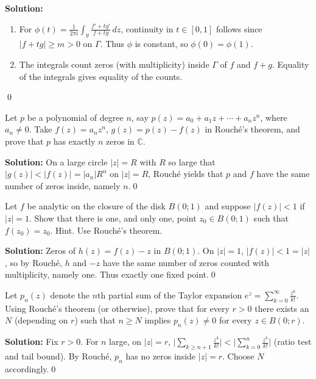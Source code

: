 \bigskip\noindent\textbf{Solution:}
\begin{enumerate}[label=(\alph*)]
\item For $\phi(t)=\frac{1}{2\pi i}\int_{y}\frac{f'+t g'}{f+tg}\,dz$, continuity in $t\in[0,1]$ follows since $|f+tg|\ge m>0$ on $\Gamma$. Thus $\phi$ is constant, so $\phi(0)=\phi(1)$.
\item The integrals count zeros (with multiplicity) inside $\Gamma$ of $f$ and $f+g$. Equality of the integrals gives equality of the counts.
\end{enumerate}\qed


\begin{problembox}
Let \( p \) be a polynomial of degree \( n \), say \( p(z) = a_0 + a_1 z + \cdots + a_n z^n \), where \( a_n \neq 0 \). Take \( f(z) = a_n z^n \), \( g(z) = p(z) - f(z) \) in Rouché's theorem, and prove that \( p \) has exactly \( n \) zeros in \( \mathbb{C} \).
\end{problembox}

\bigskip\noindent\textbf{Solution:}
On a large circle $|z|=R$ with $R$ so large that $|g(z)|<|f(z)|=|a_n|R^n$ on $|z|=R$, Rouché yields that $p$ and $f$ have the same number of zeros inside, namely $n$.\qed


\begin{problembox}
Let \( f \) be analytic on the closure of the disk \( B(0; 1) \) and suppose \( |f(z)| < 1 \) if \( |z| = 1 \). Show that there is one, and only one, point \( z_0 \in B(0; 1) \) such that \( f(z_0) = z_0 \). Hint. Use Rouché's theorem.
\end{problembox}

\bigskip\noindent\textbf{Solution:}
Zeros of $h(z)=f(z)-z$ in $B(0;1)$. On $|z|=1$, $|f(z)|<1=|z|$, so by Rouché, $h$ and $-z$ have the same number of zeros counted with multiplicity, namely one. Thus exactly one fixed point.\qed


\begin{problembox}
Let \( p_n(z) \) denote the \( n \)th partial sum of the Taylor expansion \( e^z = \sum_{k=0}^{\infty} \frac{z^k}{k!} \). Using Rouché's theorem (or otherwise), prove that for every \( r > 0 \) there exists an \( N \) (depending on \( r \)) such that \( n \geq N \) implies \( p_n(z) \neq 0 \) for every \( z \in B(0; r) \).
\end{problembox}

\bigskip\noindent\textbf{Solution:}
Fix $r>0$. For $n$ large, on $|z|=r$, $\big|\sum_{k\ge n+1} \frac{z^k}{k!}\big|<\big|\sum_{k=0}^{n} \frac{z^k}{k!}\big|$ (ratio test and tail bound). By Rouché, $p_n$ has no zeros inside $|z|=r$. Choose $N$ accordingly.\qed


